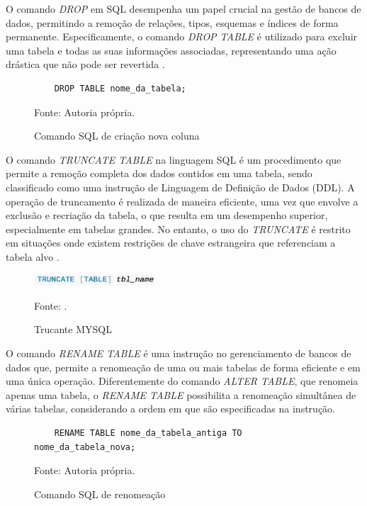 
O comando \textit{DROP} em SQL desempenha um papel crucial na gestão de bancos de dados, permitindo a remoção de relações, tipos, esquemas e índices de forma permanente. Especificamente, o comando \textit{DROP TABLE} é utilizado para excluir uma tabela e todas as suas informações associadas, representando uma ação drástica que não pode ser revertida \cite{silberschatz2011database}.

\begin{figure}[H]
    \centering
    \begin{lstlisting}
    DROP TABLE nome_da_tabela;
    \end{lstlisting}
    \caption{Comando SQL de criação nova coluna }
    Fonte: Autoria própria.
    \label{lst:sql_drop}
\end{figure}


O comando \textit{TRUNCATE TABLE} na linguagem SQL é um procedimento que permite a remoção completa dos dados contidos em uma tabela, sendo classificado como uma instrução de Linguagem de Definição de Dados (DDL). A operação de truncamento é realizada de maneira eficiente, uma vez que envolve a exclusão e recriação da tabela, o que resulta em um desempenho superior, especialmente em tabelas grandes. No entanto, o uso do \textit{TRUNCATE} é restrito em situações onde existem restrições de chave estrangeira que referenciam a tabela alvo \cite{mySQL2025}.

\begin{figure}[H]
    \centering
    \includegraphics[width=0.4\textwidth]{figuras/truncate_mysql.eps}
    \caption{Trucante MYSQL}
    Fonte: \cite{mySQL2025}.
    \label{fig:truncate}
\end{figure}



O comando \textit{RENAME TABLE} é uma instrução no gerenciamento de bancos de dados que, permite a renomeação de uma ou mais tabelas de forma eficiente e em uma única operação. Diferentemente do comando \textit{ALTER TABLE}, que renomeia apenas uma tabela, o \textit{RENAME TABLE} possibilita a renomeação simultânea de várias tabelas, considerando a ordem em que são especificadas na instrução. 

\begin{figure}[H]
    \centering
    \begin{lstlisting}
    RENAME TABLE nome_da_tabela_antiga TO nome_da_tabela_nova;
    \end{lstlisting}
    \caption{Comando SQL de renomeação}
    Fonte: Autoria própria.
    \label{lst:sql_rename}
\end{figure}

